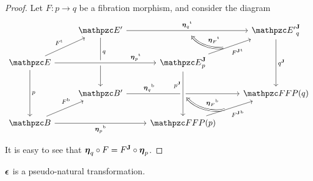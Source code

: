 \documentclass{lmcs} %
\theoremstyle{plain}\newtheorem{satz}[thm]{Satz} %
\begin{document}
\begin{proof}
	Let $F:p\rightarrow q$ be a fibration morphism, and consider the diagram
	\[\begin{tikzcd}
		& {\ct{E'}} && {\JDom{\ct{E}'}{q}} \\
		{\ct{E}} && {\JDomE{p}} \\
		& {\ct{B'}} && {\FFFP{q}} \\
		{\ct{B}} && {\FFFP{p}}
		\arrow[""{name=0, anchor=center, inner sep=0}, "{{\ft{\twont{\eta}_{q}}}}", from=1-2, to=1-4]
		\arrow["{{q}}"{pos=0.3}, from=1-2, to=3-2]
		\arrow["{{\JFib{q}}}", from=1-4, to=3-4]
		\arrow["{\ft{F}}", from=2-1, to=1-2]
		\arrow["{{\ft{\twont{\eta}_p}}}"{pos=0.8}, from=2-1, to=2-3, crossing over]
		\arrow["p", from=2-1, to=4-1]
		\arrow[""{name=1, anchor=center, inner sep=0}, "{{\ft{\JFun{F}}}}"', from=2-3, to=1-4]
		\arrow[""{name=2, anchor=center, inner sep=0}, "{{\fb{\twont{\eta}_{q}}}}"{pos=0.2}, from=3-2, to=3-4]
		\arrow["{{\JFib{p}}}"'{pos=0.3}, from=2-3, to=4-3, crossing over]
		\arrow["{\fb{F}}"{pos=0.7}, from=4-1, to=3-2]
		\arrow["{\fb{\twont{\eta}_p}}"', from=4-1, to=4-3]
		\arrow[""{name=3, anchor=center, inner sep=0}, "{{\fb{\JFun{F}}}}"', from=4-3, to=3-4]
		\arrow["\ft{\twont{\eta}_F}"', bend left, shorten <=7pt, shorten >=7pt, Rightarrow, from=1, to=0]
		\arrow["\fb{\twont{\eta}_F}"', bend left, shorten <=5pt, shorten >=5pt, Rightarrow, from=3, to=2]
	\end{tikzcd}\]
	
	It is easy to see that $\boldsymbol{\eta}_q\circ F={F}^{\mathbf{J}}\circ\boldsymbol{\eta}_p$.
\end{proof}

\begin{prop}\label{prop:jcounit}
	$\boldsymbol{\epsilon}$ is a pseudo-natural transformation.
\end{prop}
\end{document}
